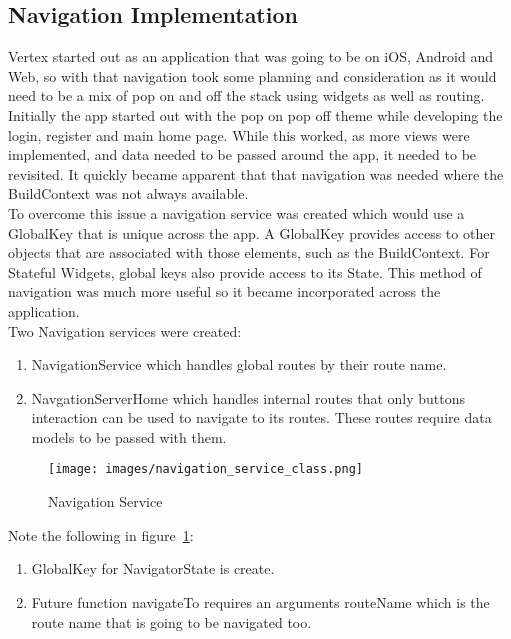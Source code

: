 \subsection{Navigation Implementation}
\label{NavSection}
Vertex started out as an application that was going to be on iOS, Android and Web, so with that navigation took some planning and consideration as it would need to be a mix of pop on and off the stack using widgets as well as routing.
\\ Initially the app started out with the pop on pop off theme while developing the login, register and main home page. While this worked, as more views were implemented, and data needed to be passed around the app, it needed to be revisited. It quickly became apparent that that navigation was needed where the BuildContext was not always available.
\\ To overcome this issue a navigation service was created which would use a GlobalKey that is unique across the app. A GlobalKey provides access to other objects that are associated with those elements, such as the BuildContext. For Stateful Widgets, global keys also provide access to its State. This method of navigation was much more useful so it became incorporated across the application. 
\\ Two Navigation services were created:
\begin{enumerate}
    \item NavigationService which handles global routes by their route name.
    \item NavgationServerHome which handles internal routes that only buttons interaction can be used to navigate to its routes. These routes require data models to be passed with them.
\end{enumerate}

\begin{figure}[h!]
    \caption{Navigation Service}
    \label{image:navService}
    \centering
    \texttt{[image: images/navigation\_service\_class.png]}
\end{figure}

Note the following in figure~\ref{image:navService}:
\begin{enumerate}
    \item GlobalKey for NavigatorState is create.
    \item Future function navigateTo requires an arguments routeName which is the route name that is going to be navigated too.
\end{enumerate}

